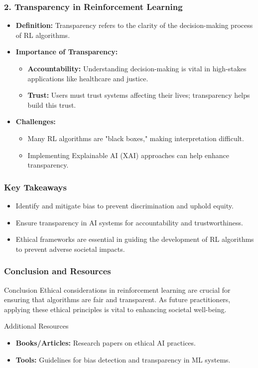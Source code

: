 \documentclass[aspectratio=169]{beamer}
\begin{document}
\begin{frame}[fragile]
    \frametitle{2. Transparency in Reinforcement Learning}
    \begin{itemize}
        \item \textbf{Definition:} Transparency refers to the clarity of the decision-making process of RL algorithms.
        \item \textbf{Importance of Transparency:}
        \begin{itemize}
            \item \textbf{Accountability:} Understanding decision-making is vital in high-stakes applications like healthcare and justice.
            \item \textbf{Trust:} Users must trust systems affecting their lives; transparency helps build this trust.
        \end{itemize}
        \item \textbf{Challenges:}
        \begin{itemize}
            \item Many RL algorithms are "black boxes," making interpretation difficult.
            \item Implementing Explainable AI (XAI) approaches can help enhance transparency.
        \end{itemize}
    \end{itemize}
\end{frame}

\begin{frame}[fragile]
    \frametitle{Key Takeaways}
    \begin{itemize}
        \item Identify and mitigate bias to prevent discrimination and uphold equity.
        \item Ensure transparency in AI systems for accountability and trustworthiness.
        \item Ethical frameworks are essential in guiding the development of RL algorithms to prevent adverse societal impacts.
    \end{itemize}
\end{frame}

\begin{frame}[fragile]
    \frametitle{Conclusion and Resources}
    \begin{block}{Conclusion}
        Ethical considerations in reinforcement learning are crucial for ensuring that algorithms are fair and transparent. As future practitioners, applying these ethical principles is vital to enhancing societal well-being.
    \end{block}
    
    \begin{block}{Additional Resources}
        \begin{itemize}
            \item \textbf{Books/Articles:} Research papers on ethical AI practices.
            \item \textbf{Tools:} Guidelines for bias detection and transparency in ML systems.
        \end{itemize}
    \end{block}
\end{frame}
\end{document}
